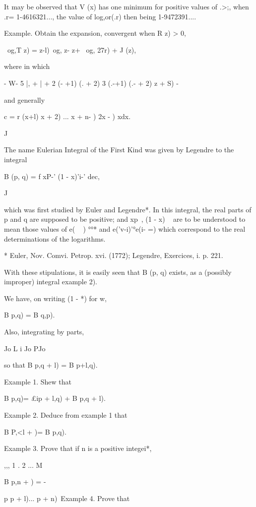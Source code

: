 It may be observed that V (x) has one minimum for positive values of
.>;, when .r= 1-4616321..., the value of log,or(.r) then being
1-9472391....

Example. Obtain the expansion, convergent when R z) > 0,

\ og,T z) = z-l)\ og, z- z+ \ og, 27r) + J (z),

where in which

- W- 5 |, + | + 2 (- +1) (. + 2) 3 (.-+1) (.- + 2) z + S) -

and generally

c = r (x+l) x + 2) ... x + n- ) 2x - ) xdx. 

J


The name Eulerian Integral of the First Kind was given by Legendre to
the integral

B (p, q) = f xP-' (1 - x)'i-' dec,

J

which was first studied by Euler and Legendre*. In this integral, the
real parts of p and q are supposed to be positive; and xp~, (1 - x) ~
are to be understood to mean those values of e( ~ ) °°* and
e('v-i)'°e(i- =) which correspond to the real determinations of the
logarithms.

* Euler, Nov. Comvi. Petrop. xvi. (1772); Legendre, Exercices, i. p.
221.

%
%

With these stipulations, it is easily seen that B (p, q) exists, as a
(possibly improper) integral  example 2).

We have, on writing (1 - *) for w,

B p,q) = B q,p).

Also, integrating by parts,

Jo L i Jo PJo

so that B p,q + l) = B p+l,q).

Example 1. Shew that

B p,q)= £ip + l,q) + B p,q + l).

Example 2. Deduce from example 1 that

B P,<l + )= B p,q).

Example 3. Prove that if n is a positive integei*,

,,, 1 . 2 ... M

B p,n + ) = -

p p + l)... p + n)\ Example 4. Prove that

